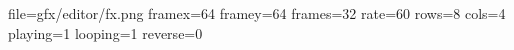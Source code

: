 file=gfx/editor/fx.png
framex=64
framey=64
frames=32
rate=60
rows=8
cols=4
playing=1
looping=1
reverse=0
